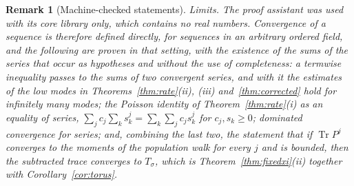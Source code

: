 \documentclass[11pt,a4paper]{article}
\theoremstyle{stmt}
\theoremstyle{defn}
\theoremstyle{rmk}
\newtheorem{remark}[theorem]{Remark}
\numberwithin{equation}{section}
\DeclareMathOperator{\Tr}{Tr}
\begin{document}
{\begin{remark}[Machine-checked statements]
\emph{Limits.} The proof assistant was used with its core library only, which contains no real numbers. Convergence of a sequence is therefore defined directly, for sequences in an arbitrary ordered field, and the following are proven in that setting, with the existence of the sums of the series that occur as hypotheses and without the use of completeness: a termwise inequality passes to the sums of two convergent series, and with it the estimates of the low modes in Theorems~\ref{thm:rate}(ii), (iii) and~\ref{thm:corrected} hold for infinitely many modes; the Poisson identity of Theorem~\ref{thm:rate}(i) as an equality of series, $\sum_jc_j\sum_ks_k^j=\sum_k\sum_jc_js_k^j$ for $c_j,s_k\ge0$; dominated convergence for series; and, combining the last two, the statement that if $\Tr P^j$ converges to the moments of the population walk for every $j$ and is bounded, then the subtracted trace converges to $T_\sigma$, which is Theorem~\ref{thm:fixedxi}(ii) together with Corollary~\ref{cor:torus}.


\end{remark}}
\end{document}
